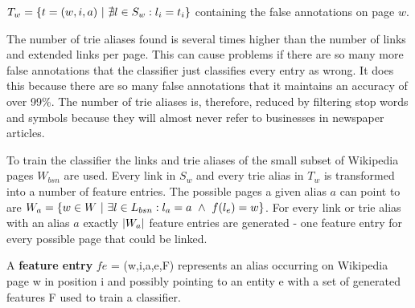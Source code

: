 $T_w = \{ t = (w,i,a) {\mbox{ }|\mbox{ }} \nexists l \in S_w: l_i = t_i \}$ containing the false annotations on page $w$.\par
The number of trie aliases found is several times higher than the number of links and extended links per page. This can cause problems if there are so many more false annotations that the classifier just classifies every entry as wrong. It does this because there are so many false annotations that it maintains an accuracy of over 99\%. The number of trie aliases is, therefore, reduced by filtering stop words and symbols because they will almost never refer to businesses in newspaper articles.\par
To train the classifier the links and trie aliases of the small subset of Wikipedia pages $W_{bsn}$ are used. Every link in $S_w$ and every trie alias in $T_w$ is transformed into a number of feature entries. The possible pages a given alias $a$ can point to are $W_a = \{ w \in W {\mbox{ }|\mbox{ }} \exists l \in L_{bsn}: l_a = a {\mbox{ }\wedge\mbox{ }} f(l_e) = w \}$. For every link or trie alias with an alias $a$ exactly $\left|W_a\right|$ feature entries are generated - one feature entry for every possible page that could be linked.
\begin{definition}
A \textbf{feature entry} $fe$ = (w,i,a,e,F) represents an alias occurring on Wikipedia page w in position i and possibly pointing to an entity e with a set of generated features F used to train a classifier.
\label{featureentry}
\end{definition}
